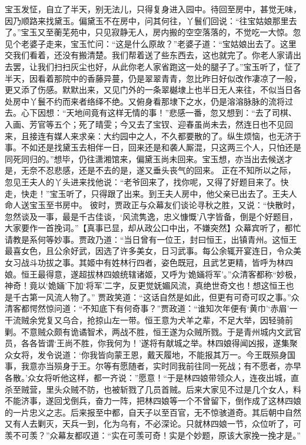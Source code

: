 \documentclass[12pt,oneside]{book}
\begin{document}
宝玉发怔，自立了半天，别无法儿，只得复身进入园中。待回至房中，甚觉无味，因乃顺路来找黛玉。偏黛玉不在房中，问其何往，丫鬟们回说：“往宝姑娘那里去了。”宝玉又至蘅芜苑中，只见寂静无人，房内搬的空空落落的，不觉吃一大惊。忽见个老婆子走来，宝玉忙问：“这是什么原故？”老婆子道：“宝姑娘出去了。这里交我们看着，还没有搬清楚。我们帮着送了些东西去，这也就完了。你老人家请出去罢，让我们扫扫灰尘也好，从此你老人家省跑这一处的腿子了。”宝玉听了，怔了半天，因看着那院中的香藤异蔓，仍是翠翠青青，忽比昨日好似改作凄凉了一般，更又添了伤感。默默出来，又见门外的一条翠樾埭上也半日无人来往，不似当日各处房中丫鬟不约而来者络绎不绝。又俯身看那埭下之水，仍是溶溶脉脉的流将过去。心下因想：“天地间竟有这样无情的事！”悲感一番，忽又想到：“去了司棋、入画、芳官等五个；死了晴雯；今又去了宝钗、迎春虽尚未去，然连日也不见回来，且接连有媒人来求亲：大约园中之人，不久都要散的了。纵生烦恼，也无济于事。不如还是找黛玉去相伴一日，回来还是和袭人厮混，只这两三个人，只怕还是同死同归的。”想毕，仍往潇湘馆来，偏黛玉尚未回来。宝玉想，亦当出去候送才是，无奈不忍悲感，还是不去的是，遂又垂头丧气的回来。
正在不知所以之际，忽见王夫人的丫头进来找他说：“老爷回来了，找你呢，又得了好题目来了。快走，快走！”宝玉听了，只得跟了出来。到王夫人房中，他父亲已出去了。王夫人命人送宝玉至书房中。
彼时，贾政正与众幕友们谈论寻秋之胜，又说：“快散时，忽然谈及一事，最是千古佳谈，‘风流隽逸，忠义慷慨’八字皆备，倒是个好题目，大家要作一首挽词。”【真事已显，却从政公口中出，不嫌突然】众幕宾听了，都忙请教是系何等妙事。贾政乃道：“当日曾有一位王，封曰恒王，出镇青州。这恒王最喜女色，且公余好武，因选了许多美女，日习武事。每公余辄开宴连日，令众美女习战斗功拔之事。其姬中有姓林行四者，姿色既冠，且武艺更精，皆呼为林四娘。恒王最得意，遂超拔林四娘统辖诸姬，又呼为‘姽婳将军’。”众清客都称“妙极，神奇！竟以‘姽婳’下加‘将军’二字，反更觉妩媚风流，真绝世奇文也！想这恒王也是千古第一风流人物了。”
贾政笑道：“这话自然是如此，但更有可奇可叹之事。”众清客都愕然惊问道：“不知底下有何奇事？”贾政道：“谁知次年便有‘黄巾’‘赤眉’一干流贼余党复又乌合，抢掠山左一带。恒王意为犬羊之辈，不足大举，因轻骑前剿。不意贼众颇有诡谲智术，两战不胜，恒王遂为众贼所戮。于是青州城内文武官员，各各皆谓‘王尚不胜，你我何为！’遂将有献城之举。林四娘得闻凶报，遂集聚众女将，发令说道：‘你我皆向蒙王恩，戴天履地，不能报其万一。今王既殒身国事，我意亦当殒身于王。尔等有愿随者，实时同我前往同一死战；有不愿者，亦早各散。’众女将听他这样，都一齐说：”愿意！“于是林四娘带领众人，连夜出城，直杀至贼营，里头众贼不防，也被斩戮了几员首贼。后来大家见不过是几个女人，料不能济事，遂回戈倒兵，奋力一阵，把林四娘等一个不曾留下，倒作成了这林四娘的一片忠义之志。后来报至中都，自天子以至百官，无不惊骇道奇。其后朝中自然又有人去剿灭，天兵一到，化为乌有，不必深论。只就林四娘一节，众位听了，可羡不可羡？”众幕友都叹道：“实在可羡可奇！实是个妙题，原该大家挽一挽才是。”
\end{document}
